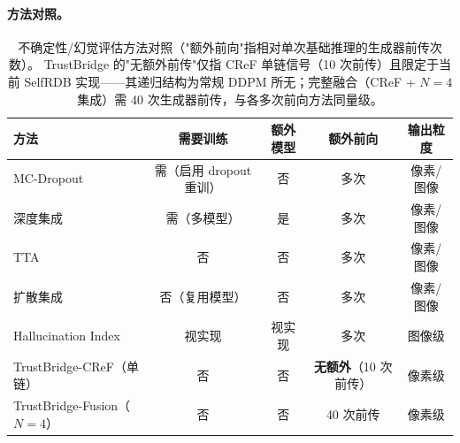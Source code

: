 \paragraph{方法对照。}
\begin{table}[h]
\centering\small
\caption{不确定性/幻觉评估方法对照（"额外前向"指相对单次基础推理的生成器前传次数）。
TrustBridge 的"无额外前传"仅指 CReF 单链信号（10 次前传）且限定于当前 SelfRDB 实现——其递归结构为常规 DDPM 所无；完整融合（CReF + $N{=}4$ 集成）需 40 次生成器前传，与各多次前向方法同量级。}
\label{tab:rw}
\begin{tabular}{lcccc}
\toprule
方法 & 需要训练 & 额外模型 & 额外前向 & 输出粒度 \\
\midrule
MC-Dropout~\cite{gal2016mcdropout} & 需（启用 dropout 重训） & 否 & 多次 & 像素/图像 \\
深度集成~\cite{lakshminarayanan2017ensembles} & 需（多模型） & 是 & 多次 & 像素/图像 \\
TTA~\cite{ayhan2018tta} & 否 & 否 & 多次 & 像素/图像 \\
扩散集成~\cite{wolleb2022diffusionensembles,osuna2024microscopy} & 否（复用模型） & 否 & 多次 & 像素/图像 \\
Hallucination Index~\cite{tivnan2024hallucinationindex} & 视实现 & 视实现 & 多次 & 图像级 \\
TrustBridge-CReF（单链） & 否 & 否 & \textbf{无额外}（10 次前传） & 像素级 \\
TrustBridge-Fusion（$N{=}4$） & 否 & 否 & 40 次前传 & 像素级 \\
\bottomrule
\end{tabular}
\end{table}

